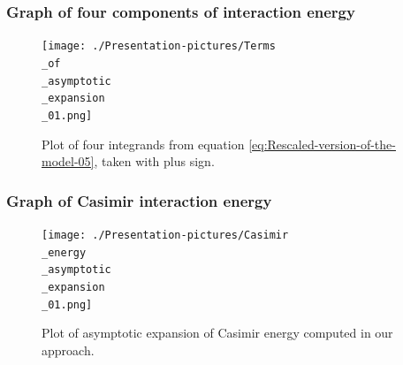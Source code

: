 \documentclass[10pt,t]{beamer}
\begin{document}
\begin{frame}
  \frametitle{Graph of four components of interaction energy}


  \begin{figure}

    \label{fig:Terms-of-asymptotic-expansion}

    \centering


    \texttt{[image: ./Presentation-pictures/Terms\\\_of\\\_asymptotic\\\_expansion\\\_01.png]}

    \caption{Plot of four integrands from equation
      \eqref{eq:Rescaled-version-of-the-model-05}, taken with plus sign.}


  \end{figure}

\end{frame}





\begin{frame}
  \frametitle{Graph of Casimir interaction energy}


  \begin{figure}

    \label{fig:Asymptotic-expansion-of-Casimir-energy}

    \centering


    \texttt{[image: ./Presentation-pictures/Casimir\\\_energy\\\_asymptotic\\\_expansion\\\_01.png]}

    \caption{Plot of asymptotic expansion of Casimir energy computed in our
      approach.}


  \end{figure}

\end{frame}
\end{document}
